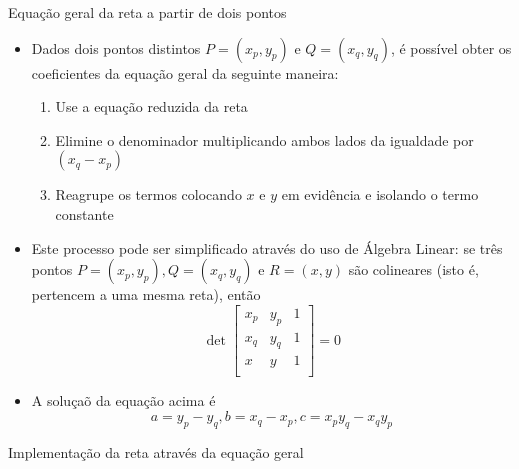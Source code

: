 \begin{frame}[fragile]{Equação geral da reta a partir de dois pontos}

    \begin{itemize}
        \item Dados dois pontos distintos $P = (x_p, y_p)$ e $Q = (x_q, y_q)$, é possível obter os 
        coeficientes da equação geral da seguinte maneira:
        \pause

        \begin{enumerate}
            \item Use a equação reduzida da reta
        \pause
            \item Elimine o denominador multiplicando ambos lados da igualdade por $(x_q - x_p)$
        \pause
            \item Reagrupe os termos colocando $x$ e $y$ em evidência e isolando o termo constante
        \end{enumerate}
        \pause

        \item Este processo pode ser simplificado através do uso de Álgebra Linear: se três pontos 
        $P = (x_p, y_p), Q = (x_q, y_q)$ e $R = (x, y)$ são colineares 
        (isto é, pertencem a uma mesma reta), então
        \[
            \det \begin{bmatrix}
                x_p & y_p  & 1 \\
                x_q & y_q  & 1 \\
                x & y  & 1 \\
            \end{bmatrix} = 0
        \]
        \pause

        \item A soluçaõ da equação acima é
        \[
            a = y_p - y_q, b = x_q - x_p, c = x_py_q - x_qy_p
        \]
    \end{itemize}
\end{frame}

\begin{frame}[fragile]{Implementação da reta através da equação geral}
\end{frame}

